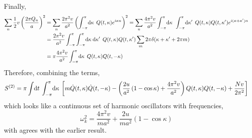 \documentclass[12pt]{extarticle}
\begin{document}
Finally,
\begin{align*}
\sum_{n} \frac{1}{2} v \left(\frac{2 \pi Q_n}{a} \right)^2 & = \sum_n \frac{2 \pi^2 v}{a^2} \left( \int_{-\pi}^{\pi} \! \mathrm{d}\kappa \: \: Q(t, \kappa) e^{i \kappa n} \right)^2 = \sum_{n} \frac{4 \pi^2 v}{a^2}  \int_{-\pi}^{\pi} \! \mathrm{d}\kappa \: \: \int_{-\pi}^{\pi} \! \mathrm{d}\kappa' \: \: Q(t, \kappa) Q(t, \kappa') e^{i (\kappa + \kappa') n} 
\\
& = \frac{2 \pi^2 v}{a^2}  \int_{-\pi}^{\pi} \int_{-\pi}^{\pi} \! \mathrm{d}\kappa \: \mathrm{d}\kappa' \: \: Q(t, \kappa) Q(t, \kappa')  \sum_{m} 2 \pi \delta(\kappa + \kappa' + 2 \pi m) \\
& = \pi \frac{4 \pi^2 v}{a^2}  \int_{-\pi}^{\pi} \! \mathrm{d}\kappa \: \: Q(t, \kappa) Q(t, -\kappa) 
\end{align*}
Therefore, combining the terms, 
\begin{align*}
S^{(2)} = \pi \int \! \mathrm{d}t \: \int_{-\pi}^{\pi} \! \mathrm{d}\kappa \: \left[m \dot{Q}(t, \kappa) \dot{Q}(t, -\kappa) - \left( \frac{2u}{a^2} \left(1 - \cos{\kappa}\right) + \frac{4 \pi^2 v}{a^2} \right) Q(t, \kappa) Q(t, -\kappa) + \frac{N v}{2 \pi^2} \right] 
\end{align*}
which looks like a continuous set of harmonic oscillators with frequencies,
\[ \omega_k^2 = \frac{4 \pi^2 v}{m a^2} + \frac{2 u}{m a^2} \left(1 - \cos{\kappa} \right) \]
with agrees with the earlier result.
\end{document}
